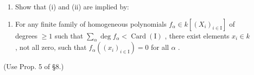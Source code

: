 \begin{enumerate}
\def\labelenumi{\alph{enumi})}
\setcounter{enumi}{2}
\tightlist
\item
  Show that (i) and (ii) are implied by:
\end{enumerate}

\begin{enumerate}
\def\labelenumi{(\roman{enumi})}
\setcounter{enumi}{3}
\tightlist
\item
  For any finite family of homogeneous polynomials \(f_{\alpha} \in k[(X_i)_{i \in \mathrm{I}}]\) of degrees \(\geq 1\) such that \(\sum_{\alpha} \deg f_{\alpha} < \operatorname{Card}(\mathrm{I})\) , there exist elements \(x_i \in k\) , not all zero, such that \(f_{\alpha}((x_i)_{i \in \mathrm{I}}) = 0\) for all \(\alpha\) .
\end{enumerate}

(Use Prop. 5 of §8.)


